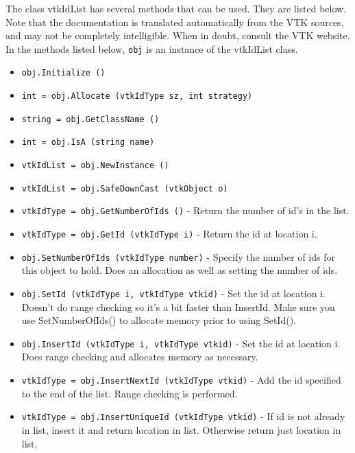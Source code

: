 The class vtkIdList has several methods that can be used.
  They are listed below.
Note that the documentation is translated automatically from the VTK sources,
and may not be completely intelligible.  When in doubt, consult the VTK website.
In the methods listed below, \verb|obj| is an instance of the vtkIdList class.
\begin{itemize}
\item  \verb|obj.Initialize ()|

\item  \verb|int = obj.Allocate (vtkIdType sz, int strategy)|

\item  \verb|string = obj.GetClassName ()|

\item  \verb|int = obj.IsA (string name)|

\item  \verb|vtkIdList = obj.NewInstance ()|

\item  \verb|vtkIdList = obj.SafeDownCast (vtkObject o)|

\item  \verb|vtkIdType = obj.GetNumberOfIds ()| -  Return the number of id's in the list.

\item  \verb|vtkIdType = obj.GetId (vtkIdType i)| -  Return the id at location i.

\item  \verb|obj.SetNumberOfIds (vtkIdType number)| -  Specify the number of ids for this object to hold. Does an
 allocation as well as setting the number of ids.

\item  \verb|obj.SetId (vtkIdType i, vtkIdType vtkid)| -  Set the id at location i. Doesn't do range checking so it's a bit
 faster than InsertId. Make sure you use SetNumberOfIds() to allocate
 memory prior to using SetId().

\item  \verb|obj.InsertId (vtkIdType i, vtkIdType vtkid)| -  Set the id at location i. Does range checking and allocates memory
 as necessary.

\item  \verb|vtkIdType = obj.InsertNextId (vtkIdType vtkid)| -  Add the id specified to the end of the list. Range checking is performed.

\item  \verb|vtkIdType = obj.InsertUniqueId (vtkIdType vtkid)| -  If id is not already in list, insert it and return location in
 list. Otherwise return just location in list.


\end{itemize}
